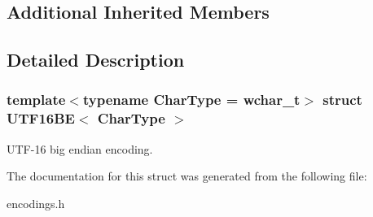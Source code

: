 \subsection*{Additional Inherited Members}


\subsection{Detailed Description}
\subsubsection*{template$<$typename Char\+Type = wchar\+\_\+t$>$\newline
struct U\+T\+F16\+B\+E$<$ Char\+Type $>$}

U\+T\+F-\/16 big endian encoding. 

The documentation for this struct was generated from the following file\+:\begin{DoxyCompactItemize}
\item 
encodings.\+h\end{DoxyCompactItemize}
